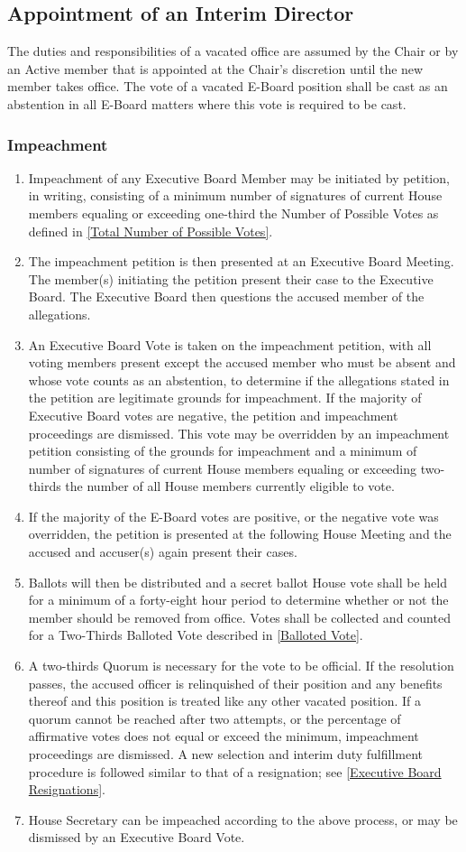 \documentclass{article}
\newcommand{\asection}[1]{\subsection{#1} \label{#1}}
\newcommand{\asubsection}[1]{\subsubsection{#1} \label{#1}}
\begin{document}
\asection{Appointment of an Interim Director}
The duties and responsibilities of a vacated office are assumed by the Chair or by an Active member that is appointed at the Chair's discretion until the new member takes office.
The vote of a vacated E-Board position shall be cast as an abstention in all E-Board matters where this vote is required to be cast.

\asubsection{Impeachment}
\begin{enumerate}
	\item Impeachment of any Executive Board Member may be initiated by petition, in writing, consisting of a minimum number of signatures of current House members equaling or exceeding one-third the Number of Possible Votes as defined in \ref{Total Number of Possible Votes}.
	\item The impeachment petition is then presented at an Executive Board Meeting.
		The member(s) initiating the petition present their case to the Executive Board.
		The Executive Board then questions the accused member of the allegations.
	\item An Executive Board Vote is taken on the impeachment petition, with all voting members present except the accused member who must be absent and whose vote counts as an abstention, to determine if the allegations stated in the petition are legitimate grounds for impeachment.
		If the majority of Executive Board votes are negative, the petition and impeachment proceedings are dismissed.
		This vote may be overridden by an impeachment petition consisting of the grounds for impeachment and a minimum of number of signatures of current House members equaling or exceeding two-thirds the number of all House members currently eligible to vote.
	\item If the majority of the E-Board votes are positive, or the negative vote was overridden, the petition is presented at the following House Meeting and the accused and accuser(s) again present their cases.
	\item Ballots will then be distributed and a secret ballot House vote shall be held for a minimum of a forty-eight hour period to determine whether or not the member should be removed from office.
		Votes shall be collected and counted for a Two-Thirds Balloted Vote described in \ref{Balloted Vote}.
	\item A two-thirds Quorum is necessary for the vote to be official.
		If the resolution passes, the accused officer is relinquished of their position and any benefits thereof and this position is treated like any other vacated position.
		If a quorum cannot be reached after two attempts, or the percentage of affirmative votes does not equal or exceed the minimum, impeachment proceedings are dismissed.
		A new selection and interim duty fulfillment procedure is followed similar to that of a resignation; see \ref{Executive Board Resignations}.
	\item House Secretary can be impeached according to the above process, or may be dismissed by an Executive Board Vote.
\end{enumerate}
\end{document}
